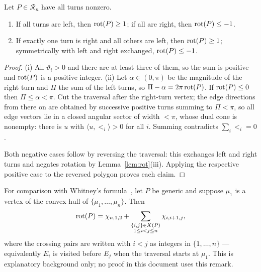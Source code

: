 \begin{lemma}\label{lem:uniformrot}
Let $P\in\mathcal R_n$ have all turns nonzero.
\begin{enumerate}
\item[(i)] If all turns are left, then $\operatorname{rot}(P)\geq1$; if all are right, then
$\operatorname{rot}(P)\leq-1$.
\item[(ii)] If exactly one turn is right and all others are left, then
$\operatorname{rot}(P)\geq1$; symmetrically with left and right exchanged, $\operatorname{rot}(P)\leq-1$.
\end{enumerate}
\end{lemma}
\begin{proof}
(i) All $\vartheta_i>0$ and there are at least three of them, so the sum is
positive and $\operatorname{rot}(P)$ is a positive integer. (ii) Let $\alpha\in(0,\pi)$ be
the magnitude of the right turn and $\Pi$ the sum of the left turns, so
$\Pi-\alpha=2\pi\operatorname{rot}(P)$. If $\operatorname{rot}(P)\leq0$ then $\Pi\leq\alpha<\pi$. Cut the
traversal after the right-turn vertex; the edge directions from there on are
obtained by successive positive turns summing to $\Pi<\pi$, so all edge
vectors lie in a closed angular sector of width $<\pi$, whose dual cone is
nonempty: there is $u$ with $\langle u,\lt_i\rangle>0$ for all $i$. Summing
contradicts $\sum_i\lt_i=0$.

Both negative cases follow by reversing the traversal: this exchanges left
and right turns and negates rotation by Lemma~\ref{lem:rot}(iii). Applying
the respective positive case to the reversed polygon proves each claim.
\end{proof}

\begin{remark}\label{prop:whitney}
For comparison with Whitney's formula~\cite{Whitney}, let $P$ be generic and suppose $\mu_1$ is a vertex of the convex hull of
$\{\mu_1,\ldots,\mu_n\}$. Then
\[
\operatorname{rot}(P)=\chi_{n,1,2}+\sum_{\substack{\{i,j\}\in X(P)\\ 1\le i<j\le n}}\chi_{i,i+1,j},
\]
where the crossing pairs are written with $i<j$ as integers in
$\{1,\ldots,n\}$ --- equivalently $E_i$ is visited before $E_j$ when the
traversal starts at $\mu_1$.
This is explanatory background only; no proof in this document uses this remark.
\end{remark}

